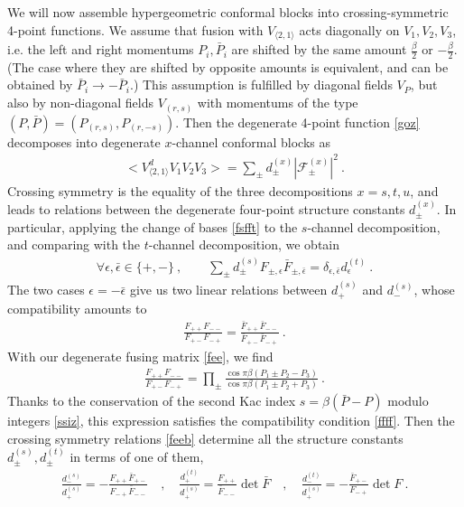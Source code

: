 \documentclass[12pt, a4paper]{article}
\theoremstyle{break}
\begin{document}
We will now assemble hypergeometric conformal blocks into crossing-symmetric 4-point functions. We assume that fusion with $V_{\langle 2,1\rangle}$ acts diagonally on $V_1,V_2,V_3$, i.e. the left and right momentums $P_i,\bar P_i$ are shifted by the same amount $\frac{\beta}{2}$ or $-\frac{\beta}{2}$. (The case where they are shifted by opposite amounts is equivalent, and can be obtained by $\bar P_i\to -\bar P_i$.) This assumption is fulfilled by diagonal fields $V_P$, but also by non-diagonal fields $V_{(r,s)}$ with momentums of the type $(P,\bar P)= (P_{(r,s)},P_{(r,-s)})$. 
Then the degenerate 4-point function \eqref{goz} decomposes into degenerate $x$-channel conformal blocks as 
\begin{align}
 \Big<V_{\langle 2,1\rangle}^dV_{1}V_{2}V_{3}\Big> 
 = \sum_\pm d^{(x)}_\pm \left|\mathcal{F}^{(x)}_\pm \right|^2  
 \ . 
\end{align}
Crossing symmetry is the equality of the three decompositions $x=s,t,u$, and leads to relations between the degenerate four-point structure constants $d^{(x)}_\pm$. In particular, applying the change of bases \eqref{fsfft} to the $s$-channel decomposition, and comparing with the $t$-channel decomposition, we obtain 
\begin{align}
 \forall \epsilon,\bar\epsilon \in \{+,-\}\ , \qquad \sum_\pm d_\pm^{(s)} F_{\pm,\epsilon}\bar F_{\pm, \bar\epsilon} = \delta_{\epsilon,\bar\epsilon} d_\epsilon^{(t)}\ . 
 \label{feeb}
\end{align}
The two cases $\epsilon = -\bar\epsilon$ give us two linear relations between $d^{(s)}_+$ and $d^{(s)}_-$, whose compatibility amounts to 
\begin{align}
 \frac{F_{++}F_{--}}{F_{+-}F_{-+}} = \frac{\bar F_{++}\bar F_{--}}{\bar F_{+-}\bar F_{-+}}\ .
 \label{ffff}
\end{align}
With our degenerate fusing matrix \eqref{fee}, we find 
\begin{align}
 \frac{F_{++}F_{--}}{F_{+-}F_{-+}} = \prod_\pm \frac{\cos \pi \beta(P_1\pm P_2-P_3)}{\cos \pi \beta(P_1\pm P_2+P_3)}\ . 
\end{align}
Thanks to the conservation of the second Kac index $s=\beta(\bar P-P)$ modulo integers \eqref{ssiz}, this expression satisfies the compatibility condition \eqref{ffff}. Then the crossing symmetry relations \eqref{feeb} determine all the structure constants $d^{(s)}_\pm,d^{(t)}_\pm$ in terms of one of them,
\begin{align}
 \frac{d^{(s)}_-}{d^{(s)}_+} = -\frac{F_{++}\bar F_{+-}}{F_{-+}\bar F_{--}}\quad , \quad 
 \frac{d^{(t)}_+}{d^{(s)}_+} = \frac{F_{++}}{\bar F_{--}} \det \bar F \quad , \quad 
 \frac{d^{(t)}_-}{d^{(s)}_+} = -\frac{\bar F_{+-}}{F_{-+}} \det F\ .
\end{align}
\end{document}
